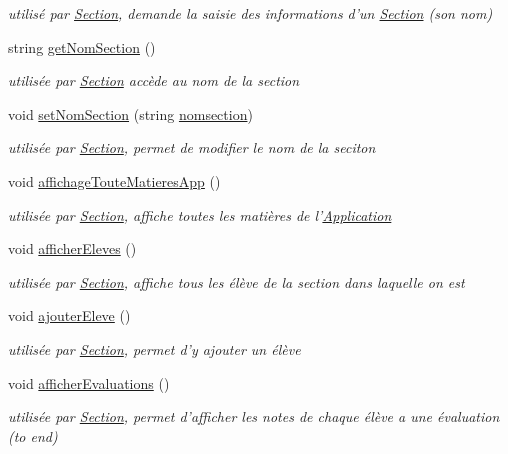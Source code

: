 \begin{DoxyCompactItemize}
\begin{DoxyCompactList}\small\item\em utilisé par \hyperlink{class_section}{Section}, demande la saisie des informations d'un \hyperlink{class_section}{Section} (son nom) \end{DoxyCompactList}\item 
string \hyperlink{class_section_a432b7a6163aa6225e74de5560fe09b00}{get\+Nom\+Section} ()
\begin{DoxyCompactList}\small\item\em utilisée par \hyperlink{class_section}{Section} accède au nom de la section \end{DoxyCompactList}\item 
void \hyperlink{class_section_aaa255f02935c89189d64037ec453495b}{set\+Nom\+Section} (string \hyperlink{class_section_a74c53e192d8055ffe2ef8ca0e814662c}{nomsection})
\begin{DoxyCompactList}\small\item\em utilisée par \hyperlink{class_section}{Section}, permet de modifier le nom de la seciton \end{DoxyCompactList}\item 
void \hyperlink{class_section_a22fe3717cd11f7192f39c71c9131b24f}{affichage\+Toute\+Matieres\+App} ()
\begin{DoxyCompactList}\small\item\em utilisée par \hyperlink{class_section}{Section}, affiche toutes les matières de l'\hyperlink{class_application}{Application} \end{DoxyCompactList}\item 
void \hyperlink{class_section_a6334f5782c68c7bfc076f9c3a4e3ef50}{afficher\+Eleves} ()
\begin{DoxyCompactList}\small\item\em utilisée par \hyperlink{class_section}{Section}, affiche tous les élève de la section dans laquelle on est \end{DoxyCompactList}\item 
void \hyperlink{class_section_afa8816db504195a8c1f5c9d8c3ccbd34}{ajouter\+Eleve} ()
\begin{DoxyCompactList}\small\item\em utilisée par \hyperlink{class_section}{Section}, permet d'y ajouter un élève \end{DoxyCompactList}\item 
void \hyperlink{class_section_a9ccb8ae4950c3fb7003283d63eeb1f2a}{afficher\+Evaluations} ()
\begin{DoxyCompactList}\small\item\em utilisée par \hyperlink{class_section}{Section}, permet d'afficher les notes de chaque élève a une évaluation (to end) \end{DoxyCompactList}\item 

\end{DoxyCompactItemize}
